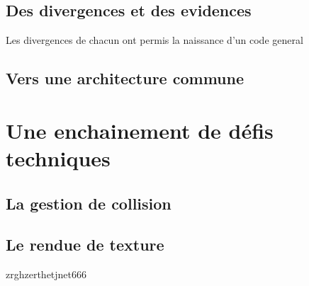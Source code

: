 \documentclass[french,12pt]{article}
\begin{document}
\subsection{Des divergences et des evidences}
Les divergences de chacun ont permis la naissance d'un code general

\subsection{Vers une architecture commune}

\section{Une enchainement de défis techniques}
\subsection{La gestion de collision}

\subsection{Le rendue de texture}

zrghzerthetjnet666
\end{document}
